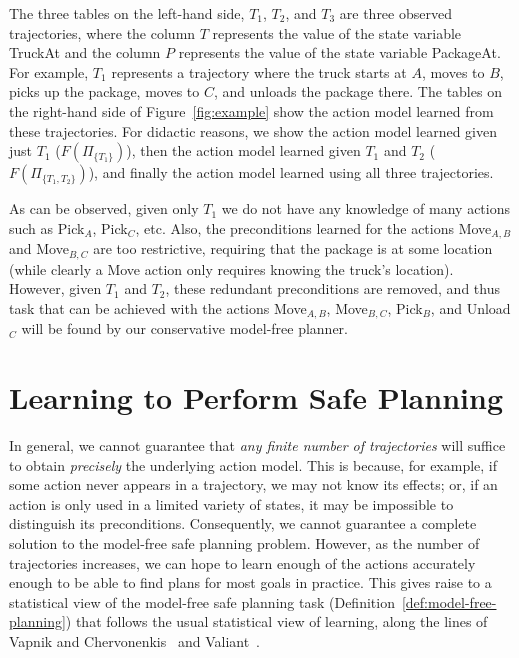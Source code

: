 \documentclass{article}
\begin{document}
	
	
	The three tables on the left-hand side, $T_1$, $T_2$, and $T_3$ are three observed trajectories, where the column $T$ represents the value of the state variable TruckAt and the column $P$ represents the value of the state variable PackageAt. For example, $T_1$ represents a trajectory where the truck starts at $A$, moves to $B$, picks up the package, moves to $C$, and unloads the package there. 	The tables on the right-hand side of Figure~\ref{fig:example} show the action model learned from these trajectories. For didactic reasons, we show the action model learned given just $T_1$ ($F(\Pi_{\{T_1\}})$), 
	then the action model learned given $T_1$ and $T_2$ ($F(\Pi_{\{T_1, T_2\}})$), and finally 
	the action model learned using all three trajectories. 
	
	
	As can be observed, given only $T_1$ we do not have any knowledge of many actions such as Pick$_A$, Pick$_C$, etc. Also, the preconditions learned for the actions Move$_{A,B}$ 
	and Move$_{B,C}$ are too restrictive, requiring that the package is at some location (while clearly a Move action only requires knowing the truck's location). However, given $T_1$ and $T_2$, these redundant preconditions are removed, and thus task that can be achieved with the actions Move$_{A,B}$, Move$_{B,C}$, Pick$_B$, and Unload$_C$ will be found by our conservative model-free planner. 
	
	
	
	\section{Learning to Perform Safe Planning}\label{learning-sec}
	In general, we cannot guarantee that {\em any finite number of trajectories} will suffice to obtain {\em precisely} the underlying action model. This is because, for example, if some action never appears in a trajectory, we may not know its effects; or, if an action is only used in a limited variety of states, it may be impossible to distinguish its preconditions. Consequently, we cannot guarantee a complete solution to the model-free safe planning problem. However, as the number of trajectories increases, we can hope to learn enough of the actions accurately enough to be able to find plans for most goals in practice. This gives raise to a statistical view of the model-free safe planning task (Definition~\ref{def:model-free-planning}) that follows the usual statistical view of learning, along the lines of Vapnik and Chervonenkis~ and Valiant~.  %
	
\end{document}
